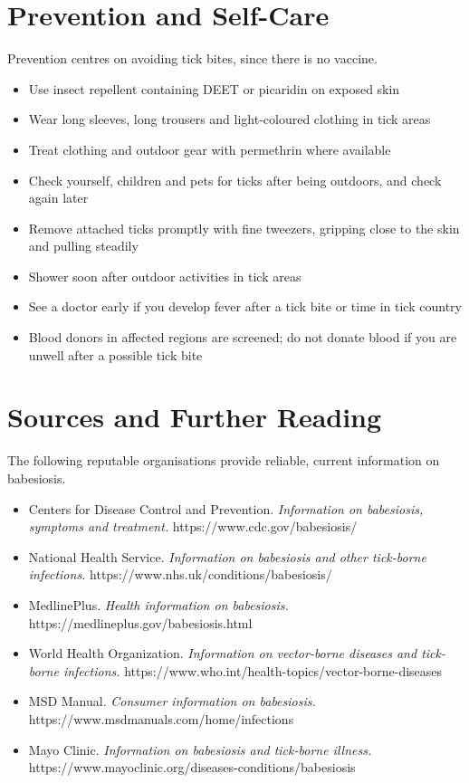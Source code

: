 \section*{Prevention and Self-Care}
Prevention centres on avoiding tick bites, since there is no vaccine.

\begin{itemize}
    \item Use insect repellent containing DEET or picaridin on exposed skin
    \item Wear long sleeves, long trousers and light-coloured clothing in tick areas
    \item Treat clothing and outdoor gear with permethrin where available
    \item Check yourself, children and pets for ticks after being outdoors, and check again later
    \item Remove attached ticks promptly with fine tweezers, gripping close to the skin and pulling steadily
    \item Shower soon after outdoor activities in tick areas
    \item See a doctor early if you develop fever after a tick bite or time in tick country
    \item Blood donors in affected regions are screened; do not donate blood if you are unwell after a possible tick bite
\end{itemize}

\section*{Sources and Further Reading}
The following reputable organisations provide reliable, current information on babesiosis.

\begin{itemize}
    \item Centers for Disease Control and Prevention. \textit{Information on babesiosis, symptoms and treatment.} https://www.cdc.gov/babesiosis/
    \item National Health Service. \textit{Information on babesiosis and other tick-borne infections.} https://www.nhs.uk/conditions/babesiosis/
    \item MedlinePlus. \textit{Health information on babesiosis.} https://medlineplus.gov/babesiosis.html
    \item World Health Organization. \textit{Information on vector-borne diseases and tick-borne infections.} https://www.who.int/health-topics/vector-borne-diseases
    \item MSD Manual. \textit{Consumer information on babesiosis.} https://www.msdmanuals.com/home/infections
    \item Mayo Clinic. \textit{Information on babesiosis and tick-borne illness.} https://www.mayoclinic.org/diseases-conditions/babesiosis
\end{itemize}
